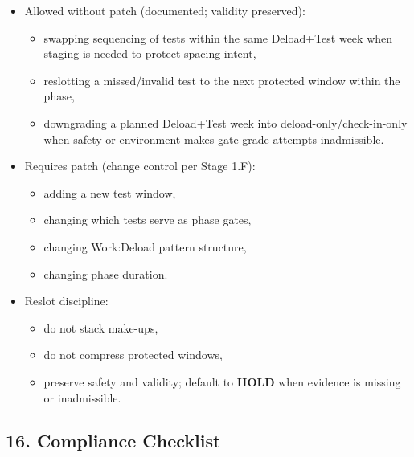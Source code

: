 \documentclass[10pt]{article}
\begin{document}
\begin{itemize}
\item Allowed without patch (documented; validity preserved):
  \begin{itemize}
  \item swapping sequencing of tests within the same Deload+Test week when staging is needed to protect spacing intent,
  \item reslotting a missed/invalid test to the next protected window within the phase,
  \item downgrading a planned Deload+Test week into deload-only/check-in-only when safety or environment makes gate-grade attempts inadmissible.
  \end{itemize}
\item Requires patch (change control per Stage 1.F):
  \begin{itemize}
  \item adding a new test window,
  \item changing which tests serve as phase gates,
  \item changing Work:Deload pattern structure,
  \item changing phase duration.
  \end{itemize}
\item Reslot discipline:
  \begin{itemize}
  \item do not stack make-ups,
  \item do not compress protected windows,
  \item preserve safety and validity; default to \textbf{HOLD} when evidence is missing or inadmissible.
  \end{itemize}
\end{itemize}

\subsection*{16. Compliance Checklist}
\end{document}
